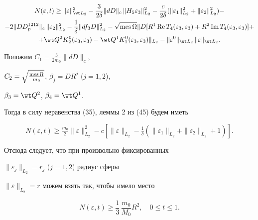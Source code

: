 \begin{multline} 


N(\varepsilon,t)\ge\|\varepsilon\|^2_{\wt L_2}-\frac{3}{2\delta} 


\|dD\|_c\,\|H_5\varepsilon_3\|^2_{L_2}-\frac{c}{2\delta} 


(\|\varepsilon_1\|^2_{L_2}+\|\varepsilon_2\|^2_{L_2})- \\


- 2\|DD^{1212}_p\|_c\,\|\varepsilon_2\|^2_{L_2}-\frac{1}{\delta} 


\|df_3D\|^2_{L_2} - 


\sqrt{\mes \Omega}\|D[R^1\re T_4(\varepsilon_3,\varepsilon_3)+ 


R^2\im T_4(\varepsilon_3,\varepsilon_3)]+ \\


+\wt Q^2K^0_2(\varepsilon_3,\varepsilon_3)- 


\wt Q^1K^0_1(\varepsilon_3,\varepsilon_3)\|_{L_2}- 


\|\varepsilon^0\|_{\wt L_2}\,\|\varepsilon\|_{\wt L_2}.


\end{multline} 


Положим $C_1=\frac{3}{2m_0}\|dD\|_c$, 


$C_2=\sqrt{\frac{\operatorname{mes}\Omega}{m_0}}$, $\beta_j=DR^j$ ($j=1,2$), 


$\beta_3=\wt Q^2$, $\beta_4=\wt Q^1$. 


Тогда в силу неравенства (35), леммы 2 из (45) будем иметь 


$$ 


N(\varepsilon,t)\ge\tfrac{m_0}{2}\|\varepsilon\|^2_{L_2}- 


c[\|\varepsilon\|_{L_2}-\tfrac{1}{\delta} 


(\|\varepsilon_1\|_{L_2}+\|\varepsilon_2\|_{L_2}+1)]. 


$$ 


Отсюда следует, что при произвольно фиксированных 


$\|\varepsilon_j\|_{L_2}=r_j$ ($j=1,2$) радиус сферы 


$\|\varepsilon\|_{L_2}=r$ можем взять так, чтобы имело место 


\begin{equation} 


N(\varepsilon,t)\ge\frac{1}{3}\,\frac{m_0}{M_0}R^2,\quad 


0\le t\le 1. 


\end{equation} 


